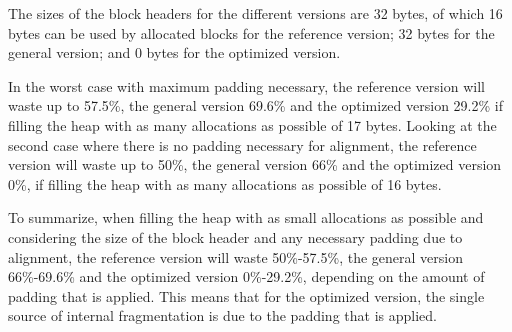 The sizes of the block headers for the different versions are 32 bytes, of which 16 bytes can be used by allocated blocks for the reference version; 32 bytes for the general version; and 0 bytes for the optimized version. 

In the worst case with maximum padding necessary, the reference version will waste up to 57.5\%, the general version 69.6\% and the optimized version 29.2\% if filling the heap with as many allocations as possible of 17 bytes. Looking at the second case where there is no padding necessary for alignment, the reference version will waste up to 50\%, the general version 66\% and the optimized version 0\%, if filling the heap with as many allocations as possible of 16 bytes.

To summarize, when filling the heap with as small allocations as possible and considering the size of the block header and any necessary padding due to alignment, the reference version will waste 50\%-57.5\%, the general version 66\%-69.6\% and the optimized version 0\%-29.2\%, depending on the amount of padding that is applied. This means that for the optimized version, the single source of internal fragmentation is due to the padding that is applied.

